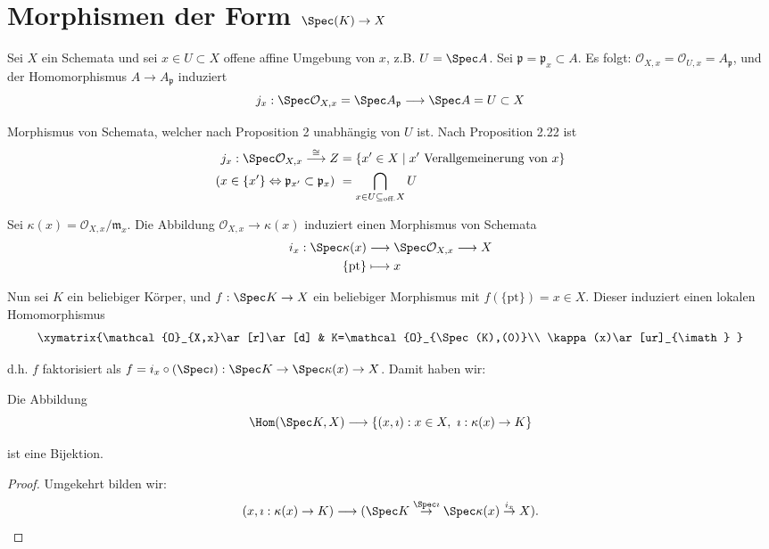 \section{Morphismen der Form $\Spec(K)\rightarrow X$}

Sei $X$ ein Schemata und sei $x\in U\subset X$ offene affine Umgebung
von $x$, z.B. $U=\Spec A$. Sei $\mathfrak{p}=\mathfrak{p}_{x}\subset A$.
Es folgt: $\mathcal{O}_{X,x}=\mathcal{O}_{U,x}=A_{\mathfrak{p}}$,
und der Homomorphismus $A\rightarrow A_{\mathfrak{p}}$ induziert
\[
  j_{x}:\Spec\mathcal{O}_{X,x}=\Spec A_{\mathfrak{p}}\longrightarrow\Spec A=U\subset X
\]

Morphismus von Schemata, welcher nach Proposition 2 unabhängig von
$U$ ist. Nach Proposition 2.22 ist
\begin{align*}
  j_{x}:\Spec\mathcal{O}_{X,x}\overset{\cong}{\longrightarrow}Z & =\{x'\in X\mid x'\text{ Verallgemeinerung von }x\}\\
  (x\in\{x'\}\Leftrightarrow\mathfrak{p}_{x'}\subset\mathfrak{p}_{x})\  & =\bigcap_{x\in U\subseteq_{\text{off.}}X}U
\end{align*}

Sei $\kappa(x)=\mathcal{O}_{X,x}/\mathfrak{m}_{x}$. Die Abbildung
$\mathcal{O}_{X,x}\rightarrow\kappa(x)$ induziert einen Morphismus
von Schemata
\begin{align*}
  i_{x}:\Spec\kappa(x) & \longrightarrow\Spec\mathcal{O}_{X,x}\longrightarrow X\\
  \{\text{pt}\} & \longmapsto x
\end{align*}

Nun sei $K$ ein beliebiger Körper, und $f:\Spec K\rightarrow X$
ein beliebiger Morphismus mit $f(\text{\{pt\}})=x\in X$. Dieser induziert
einen lokalen Homomorphismus
\[
  \xymatrix{\mathcal{O}_{X,x}\ar[r]\ar[d] & K=\mathcal{O}_{\Spec(K),(0)}\\
    \kappa(x)\ar[ur]_{\imath}
  }
\]

d.h. $f$ faktorisiert als $f=i_{x}\circ(\Spec\imath):\Spec K\rightarrow\Spec\kappa(x)\rightarrow X$.
Damit haben wir:
\begin{prop}[7]
  Die Abbildung
  \[
    \Hom(\Spec K,X)\longrightarrow\{(x,\imath):x\in X,\ \imath:\kappa(x)\rightarrow K\}
  \]

  ist eine Bijektion.
\end{prop}

\begin{proof}
  Umgekehrt bilden wir:
  \[
    (x,\imath:\kappa(x)\rightarrow K)\longrightarrow(\Spec K\overset{\Spec\imath}{\rightarrow}\Spec\kappa(x)\overset{i_{x}}{\rightarrow}X).
  \]
\end{proof}
